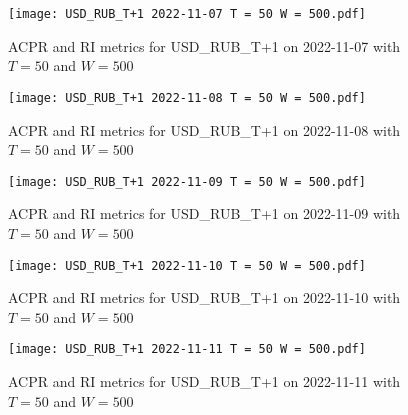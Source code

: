 \begin{figure}[htbp]
	\texttt{[image: USD\_RUB\_T+1 2022-11-07 T = 50 W = 500.pdf]}
	\caption{ACPR and RI metrics for USD\_RUB\_T+1 on 2022-11-07 with $T = 50$ and $W = 500$}
\end{figure}

\begin{figure}[htbp]
	\texttt{[image: USD\_RUB\_T+1 2022-11-08 T = 50 W = 500.pdf]}
	\caption{ACPR and RI metrics for USD\_RUB\_T+1 on 2022-11-08 with $T = 50$ and $W = 500$}
\end{figure}

\begin{figure}[htbp]
	\texttt{[image: USD\_RUB\_T+1 2022-11-09 T = 50 W = 500.pdf]}
	\caption{ACPR and RI metrics for USD\_RUB\_T+1 on 2022-11-09 with $T = 50$ and $W = 500$}
\end{figure}

\begin{figure}[htbp]
	\texttt{[image: USD\_RUB\_T+1 2022-11-10 T = 50 W = 500.pdf]}
	\caption{ACPR and RI metrics for USD\_RUB\_T+1 on 2022-11-10 with $T = 50$ and $W = 500$}
\end{figure}

\begin{figure}[htbp]
	\texttt{[image: USD\_RUB\_T+1 2022-11-11 T = 50 W = 500.pdf]}
	\caption{ACPR and RI metrics for USD\_RUB\_T+1 on 2022-11-11 with $T = 50$ and $W = 500$}
\end{figure}

